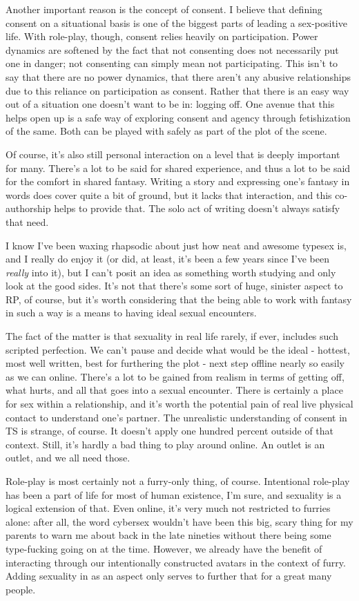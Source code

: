 Another important reason is the concept of consent. I believe that defining consent on a situational basis is one of the biggest parts of leading a sex-positive life. With role-play, though, consent relies heavily on participation. Power dynamics are softened by the fact that not consenting does not necessarily put one in danger; not consenting can simply mean not participating. This isn't to say that there are no power dynamics, that there aren't any abusive relationships due to this reliance on participation as consent. Rather that there is an easy way out of a situation one doesn't want to be in: logging off. One avenue that this helps open up is a safe way of exploring consent and agency through fetishization of the same. Both can be played with safely as part of the plot of the scene.

Of course, it's also still personal interaction on a level that is deeply important for many. There's a lot to be said for shared experience, and thus a lot to be said for the comfort in shared fantasy. Writing a story and expressing one's fantasy in words does cover quite a bit of ground, but it lacks that interaction, and this co-authorship helps to provide that. The solo act of writing doesn't always satisfy that need.

I know I've been waxing rhapsodic about just how neat and awesome typesex is, and I really do enjoy it (or did, at least, it's been a few years since I've been \emph{really} into it), but I can't posit an idea as something worth studying and only look at the good sides. It's not that there's some sort of huge, sinister aspect to RP, of course, but it's worth considering that the being able to work with fantasy in such a way is a means to having ideal sexual encounters.

The fact of the matter is that sexuality in real life rarely, if ever, includes such scripted perfection. We can't pause and decide what would be the ideal - hottest, most well written, best for furthering the plot - next step offline nearly so easily as we can online. There's a lot to be gained from realism in terms of getting off, what hurts, and all that goes into a sexual encounter. There is certainly a place for sex within a relationship, and it's worth the potential pain of real live physical contact to understand one's partner. The unrealistic understanding of consent in TS is strange, of course. It doesn't apply one hundred percent outside of that context. Still, it's hardly a bad thing to play around online. An outlet is an outlet, and we all need those.

Role-play is most certainly not a furry-only thing, of course. Intentional role-play has been a part of life for most of human existence, I'm sure, and sexuality is a logical extension of that. Even online, it's very much not restricted to furries alone: after all, the word cybersex wouldn't have been this big, scary thing for my parents to warn me about back in the late nineties without there being some type-fucking going on at the time. However, we already have the benefit of interacting through our intentionally constructed avatars in the context of furry. Adding sexuality in as an aspect only serves to further that for a great many people.
